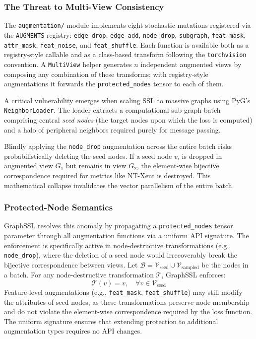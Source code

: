 \documentclass[conference]{IEEEtran}
\begin{document}
\subsubsection{The Threat to Multi-View Consistency}
The \texttt{augmentation/} module implements eight stochastic mutations registered via the \texttt{AUGMENTS} registry: \texttt{edge\_drop}, \texttt{edge\_add}, \texttt{node\_drop}, \texttt{subgraph}, \texttt{feat\_mask}, \texttt{attr\_mask}, \texttt{feat\_noise}, and \texttt{feat\_shuffle}. Each function is available both as a registry-style callable and as a class-based transform following the \texttt{torchvision} convention. A \texttt{MultiView} helper generates $n$ independent augmented views by composing any combination of these transforms; with registry-style augmentations it forwards the \texttt{protected\_nodes} tensor to each of them.

A critical vulnerability emerges when scaling SSL to massive graphs using PyG's \texttt{NeighborLoader}. The loader extracts a computational sub-graph batch comprising central \textit{seed nodes} (the target nodes upon which the loss is computed) and a halo of peripheral neighbors required purely for message passing.

Blindly applying the \texttt{node\_drop} augmentation across the entire batch risks probabilistically deleting the seed nodes. If a seed node $v_i$ is dropped in augmented view $G_1$ but remains in view $G_2$, the element-wise bijective correspondence required for metrics like NT-Xent is destroyed. This mathematical collapse invalidates the vector parallelism of the entire batch.

\subsubsection{Protected-Node Semantics}
GraphSSL resolves this anomaly by propagating a \texttt{protected\_nodes} tensor parameter through all augmentation functions via a uniform API signature. The enforcement is specifically active in node-destructive transformations (e.g., \texttt{node\_drop}), where the deletion of a seed node would irrecoverably break the bijective correspondence between views. Let $\mathcal{B} = \mathcal{V}_{\text{seed}} \cup \mathcal{V}_{\text{sampled}}$ be the nodes in a batch. For any node-destructive transformation $\mathcal{T}$, GraphSSL enforces:
\begin{equation}
\mathcal{T}(v) = v, \quad \forall v \in \mathcal{V}_{\text{seed}}
\end{equation}
Feature-level augmentations (e.g., \texttt{feat\_mask}, \texttt{feat\_shuffle}) may still modify the attributes of seed nodes, as these transformations preserve node membership and do not violate the element-wise correspondence required by the loss function. The uniform signature ensures that extending protection to additional augmentation types requires no API changes.
\end{document}
